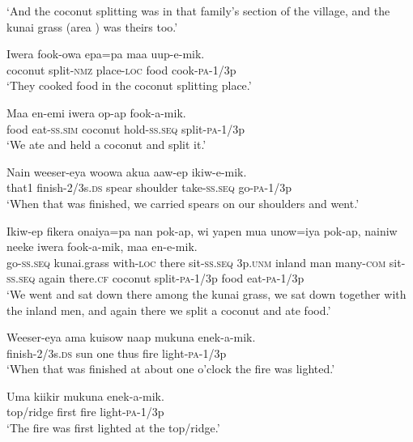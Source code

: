 \glt ‘And the coconut splitting was in that family’s section of the village, and the kunai grass (area ) was theirs too.’ \\
\z


\ea
\gll  Iwera  fook-owa  epa=pa  maa  uup-e-mik. \\
coconut  split-\textsc{nmz}  place-\textsc{loc}  food  cook-\textsc{pa}-1/3p \\
\glt ‘They cooked food in the coconut splitting place.’ \\
\z


\ea
\gll  Maa  en-emi  iwera  op-ap  fook-a-mik. \\
food  eat-\textsc{ss}.\textsc{sim}  coconut  hold-\textsc{ss.seq}  split-\textsc{pa}-1/3p \\
\glt ‘We ate and held a coconut and split it.’ \\
\z


\ea
\gll  Nain  weeser-eya  woowa  akua  aaw-ep  ikiw-e-mik. \\
that1  finish-2/3s.\textsc{ds}  spear  shoulder  take-\textsc{ss.seq}  go-\textsc{pa}-1/3p \\
\glt ‘When that was finished, we carried spears on our shoulders and went.’ \\
\z


\ea
\gll  Ikiw-ep  fikera  onaiya=pa  nan  pok-ap,  wi  yapen  mua            unow=iya  pok-ap,  nainiw  neeke  iwera  fook-a-mik,           maa  en-e-mik. \\
go-\textsc{ss.seq}  kunai.grass  with-\textsc{loc}  there  sit-\textsc{ss.seq}  3p.\textsc{unm}  inland  man  many-\textsc{com}  sit-\textsc{ss.seq}  again  there.\textsc{cf}  coconut  split-\textsc{pa}-1/3p  food  eat-\textsc{pa}-1/3p \\




\glt ‘We went and sat down there among the kunai grass, we sat down together with the inland men, and again there we split a coconut and ate food.’ \\
\z


\ea
\gll  Weeser-eya  ama  kuisow  naap  mukuna  enek-a-mik. \\
finish-2/3s.\textsc{ds}  sun  one  thus  fire  light-\textsc{pa}-1/3p \\
\glt ‘When that was finished at about one o’clock the fire was lighted.’ \\
\z


\ea
\gll  Uma  kiikir  mukuna  enek-a-mik. \\
top/ridge  first  fire  light-\textsc{pa}-1/3p \\
\glt ‘The fire was first lighted at the top/ridge.’ \\
\z


